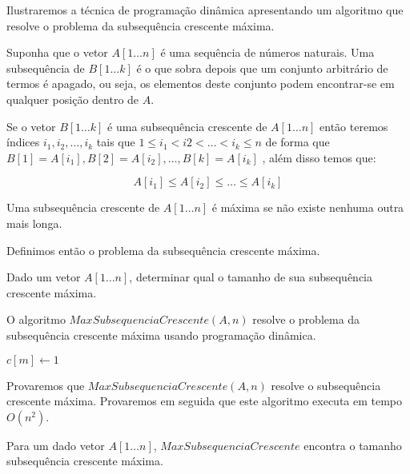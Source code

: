 Ilustraremos a técnica de programação dinâmica apresentando um algoritmo que resolve o problema da subsequência crescente máxima.

Suponha que o vetor $A[1 \ldots n]$ é uma sequência de números naturais. Uma subsequência de $B[1 \ldots k]$ é o que sobra depois que um conjunto arbitrário de termos é apagado, ou seja, os elementos deste conjunto podem encontrar-se em qualquer posição dentro de $A$.

Se o vetor $B[1 \ldots k]$ é uma subsequência crescente de $A[1 \ldots n]$ então teremos índices $i_1,i_2,\ldots,i_k$ tais que $1 \leq i_1 < i2 < \ldots < i_k \leq n$  de forma que $B[1] = A[i_1],  B[2] = A[i_2], \ldots ,  B[k] = A[i_k]$ , além disso temos que:

\begin{equation}
A[i_1] \leq A[i_2] \leq \ldots \leq A[i_k]
\end{equation}

Uma subsequência crescente de $A[1 \ldots n]$ é máxima se não existe nenhuma outra mais longa.

Definimos então o problema da subsequência crescente máxima.

\begin{definition}
Dado um vetor $A[1 \ldots n]$, determinar qual o tamanho de sua subsequência crescente máxima.
\end{definition}

O algoritmo $MaxSubsequenciaCrescente (A,n)$ resolve o problema da subsequência crescente máxima usando programação dinâmica.

\begin{algorithm}[H]
\SetAlgoLined
{}
{
    $c[m] \leftarrow 1$
    
}


\caption{$MaxSubsequenciaCrescente (A,n$)}
\label{alg:ssc}
\end{algorithm}

Provaremos que $MaxSubsequenciaCrescente (A,n)$ resolve o subsequência crescente máxima. Provaremos em seguida que este algoritmo executa em tempo $O( n ^ 2)$.

\begin{teorema}

Para um dado vetor $A[1 \ldots n]$, $MaxSubsequenciaCrescente$ encontra o tamanho subsequência crescente máxima.

\end {teorema}

